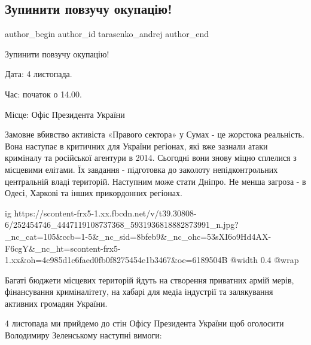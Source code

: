  
 
 
 
 
 
\subsection{Зупинити повзучу окупацію!}
\label{sec:02_11_2021.fb.tarasenko_andrej.1.okupacia_ostanovit}
 
\ifcmt
 author_begin
   author_id tarasenko_andrej
 author_end
\fi

Зупинити повзучу окупацію!

Дата: 4 листопада.

Час: початок о 14.00. 

Місце:  Офіс Президента України

Замовне вбивство активіста «Правого сектора» у Сумах - це жорстока реальність.
Вона наступає в критичних для України регіонах, які вже зазнали атаки криміналу
та російської агентури в 2014. Сьогодні вони знову міцно сплелися з місцевими
елітами. Їх завдання - підготовка  до заколоту непідконтрольних центральній
владі територій. Наступним може стати Дніпро. Не менша загроза - в Одесі,
Харкові та інших прикордонних регіонах. 

\ifcmt
  ig https://scontent-frx5-1.xx.fbcdn.net/v/t39.30808-6/252454746_4447119108737368_5931936818882873991_n.jpg?_nc_cat=105&ccb=1-5&_nc_sid=8bfeb9&_nc_ohc=53sXI6o9Hd4AX-F6cgY&_nc_ht=scontent-frx5-1.xx&oh=4c985d1c6faed0fb0f8275454e1b3467&oe=6189504B
  @width 0.4
  @wrap 
\fi

Багаті бюджети місцевих територій йдуть на створення приватних армій мерів,
фінансування криміналітету, на хабарі для медіа індустрії та залякування
активних громадян України.

4 листопада ми прийдемо до стін Офісу Президента України щоб оголосити
Володимиру Зеленському наступні вимоги:

